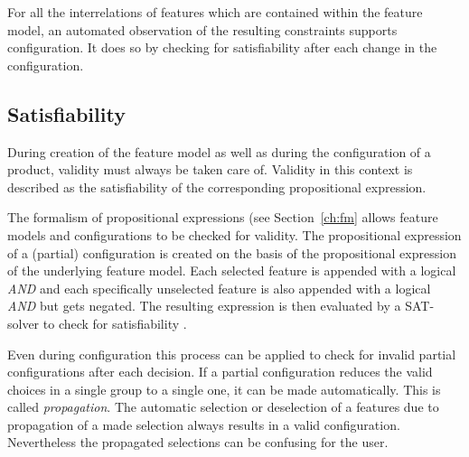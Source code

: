 For all the interrelations of features which are contained within the feature model, an automated observation of the resulting constraints supports configuration. It does so by checking for satisfiability after each change in the configuration.


\subsection{Satisfiability} \label{ch:sat}
During creation of the feature model as well as during the configuration of a product, validity must always be taken care of. Validity in this context is described as the satisfiability of the corresponding propositional expression.

The formalism of propositional expressions (see Section~\ref{ch:fm} allows feature models and configurations to be checked for validity. The propositional expression of a (partial) configuration is created on the basis of the propositional expression of the underlying feature model. Each selected feature is appended with a logical \textit{AND} and each specifically unselected feature is also appended with a logical \textit{AND} but gets negated. The resulting expression is then evaluated by a SAT-solver to check for satisfiability \cite{sat-solve}.

Even during configuration this process can be applied to check for invalid partial configurations after each decision. If a partial configuration reduces the valid choices in a single group to a single one, it can be made automatically. This is called \textit{propagation}. The automatic selection or deselection of a features due to propagation of a made selection always results in a valid configuration. Nevertheless the propagated selections can be confusing for the user.